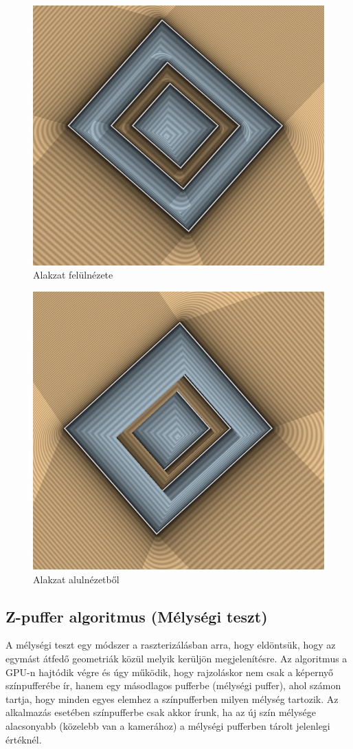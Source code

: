 \begin{figure}[H]
    \centering
    \includegraphics[width=.6\linewidth]{images/algorithm_output_top_down.png}
    \caption{Alakzat felülnézete}
    \label{fig:algorithm_output_top_down-1}
\end{figure}
\begin{figure}[H]
    \centering
    \includegraphics[width=.6\linewidth]{images/algorithm_output_bottom_up.png}
    \caption{Alakzat alulnézetből}
    \label{fig:algorithm_output_bottom_up-1}
\end{figure}

\subsection{Z-puffer algoritmus (Mélységi teszt)}
A mélységi teszt egy módszer a raszterizálásban arra, hogy eldöntsük, hogy az egymást átfedő geometriák közül melyik kerüljön megjelenítésre. Az algoritmus a GPU-n hajtódik végre és úgy működik, hogy rajzoláskor nem csak a képernyő színpufferébe ír, hanem egy másodlagos pufferbe (mélységi puffer), ahol számon tartja, hogy minden egyes elemhez a színpufferben milyen mélység tartozik. Az alkalmazás esetében színpufferbe csak akkor írunk, ha az új szín mélysége alacsonyabb (közelebb van a kamerához) a mélységi pufferben tárolt jelenlegi értéknél.

